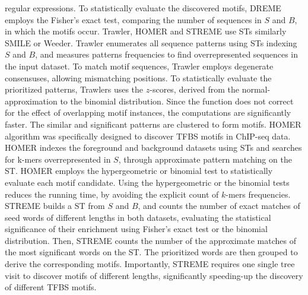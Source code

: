\documentclass[a4paper, titlepage, openright]{book}
\begin{document}
regular expressions. To statistically evaluate the discovered motifs, DREME employs the Fisher's exact test, comparing the number of sequences in $S$ and $B$, in which the motifs occur. Trawler, HOMER and STREME \citep{ettwiller2007trawler,heinz2010simple,bailey2021streme} use STs similarly SMILE or Weeder. Trawler enumerates all sequence patterns using STs indexing $S$ and $B$, and measures patterns frequencies to find overrepresented sequences in the input dataset. To match motif sequences, Trawler employs degenerate consensuses, allowing mismatching positions. To statistically evaluate the prioritized patterns, Trawlers uses the $z$-scores, derived from the normal-approximation to the binomial distribution. Since the function does not correct for the effect of overlapping motif instances, the computations are significantly faster. The similar and significant patterns are clustered to form motifs. HOMER algorithm was specifically designed to discover TFBS motifs in ChIP-seq data. HOMER indexes the foreground and background datasets using STs and searches for k-mers  overrepresented in $S$, through approximate pattern matching on the ST. HOMER employs the hypergeometric or binomial test to statistically evaluate each motif candidate. Using the hypergeometric or the binomial tests reduces the running time, by avoiding the explicit count of $k$-mers frequencies. STREME builds a ST from $S$ and $B$, and counts the number of exact matches of seed words of different lengths in both datasets, evaluating the statistical significance of their enrichment using Fisher's exact test or the binomial distribution. Then, STREME counts the number of the approximate matches of the most significant words on the ST. The prioritized words are then grouped to derive the corresponding motifs. Importantly, STREME requires one single tree visit to discover motifs of different lengths, significantly speeding-up the discovery of different TFBS motifs.
\end{document}
